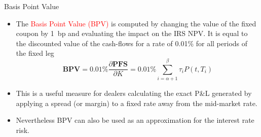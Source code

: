 \documentclass{beamer}
\begin{document}
\begin{frame}{Basis Point Value}
\begin{itemize}
	\item<1-> The \textcolor{red}{Basis Point Value (BPV)} is computed by changing the value of the fixed coupon by 1~bp and evaluating the impact on the IRS NPV. It is equal to the discounted value of the cash-flows for a rate of 0.01\% for all periods of the fixed leg
	\begin{equation}
	\textbf{BPV} = 0.01\% \frac{\partial \textbf{PFS}}{\partial K} = 0.01\% \sum_{i=\alpha+1}^\beta\tau_iP(t,T_i)
	\end{equation}
	\item<2-> This is a useful measure for dealers calculating the exact P\&L generated by applying a spread (or margin) to a fixed rate away from the mid-market rate.
	\item<3-> Nevertheless BPV can also be used as an approximation for the interest rate risk.
\end{itemize}
\end{frame}

%

\end{document}

